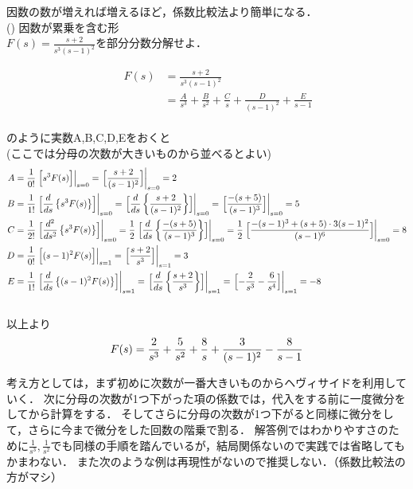\documentclass[a4paper,12pt]{report}
\begin{document}
  因数の数が増えれば増えるほど，係数比較法より簡単になる．\\

\quad({}) 因数が累乗を含む形 \\

\qquad \(F(s) =  \displaystyle\frac{s+2}{s^3(s-1)^2}\)を部分分数分解せよ．

\begin{align*}
  \qquad F(s) &= \frac{s+2}{s^3(s-1)^2} \\
      &= \frac{A}{s^3}+ \frac{B}{s^2}+ \frac{C}{s}
      + \frac{D}{(s-1)^2}+ \frac{E}{s-1}
\end{align*}\\
のように実数A,B,C,D,Eをおくと\\
(ここでは分母の次数が大きいものから並べるとよい)\\
\begin{align*}
  A &= \frac{1}{0!}\left.\Bigl[s^3F(s)\Bigr]\right|_{s=0} = \left.\Bigl[\frac{s+2}{(s-1)^2}\Bigr]\right|_{s=0} = 2\\
  B &= \frac{1}{1!}\left.\Bigl[\frac{d}{ds} \left\{s^3F(s)\right\}\Bigr]\right|_{s=0}
    = \left.\Bigl[\frac{d}{ds} \left\{\frac{s+2}{(s-1)^2}\right\}\Bigr]\right|_{s=0}
    = \left.\Bigl[\frac{-(s+5)}{(s-1)^3}\Bigr]\right|_{s=0} 
    = 5 \\
  C &=  \frac{1}{2!} \left.\Bigl[\frac{d^2}{ds^2} \left\{s^3F(s)\right\}\Bigr]\right|_{s=0} 
    = \frac{1}{2} \left.\Bigl[\frac{d}{ds} \left\{\frac{-(s+5)}{(s-1)^3}\right\}\Bigr]\right|_{s=0}  
    = \frac{1}{2} \left.\Bigl[\frac{-(s-1)^3+(s+5)\cdot3(s-1)^2}{(s-1)^6}\Bigr]\right|_{s=0} 
    = 8\\
  D &= \frac{1}{0!} \left.\Bigl[(s-1)^2F(s)\Bigr]\right|_{s=1}
    = \left.\Bigl[\frac{s+2}{s^3}\Bigr]\right|_{s=1}
    = 3\\
  E &= \frac{1}{1!} \left.\Bigl[\frac{d}{ds}\left\{(s-1)^2F(s)\right\}\Bigr]\right|_{s=1}
    = \left.\Bigl[\frac{d}{ds}\left\{\frac{s+2}{s^3}\right\}\Bigr]\right|_{s=1}
    = \left.\Bigl[-\frac{2}{s^3}-\frac{6}{s^4}\Bigr]\right|_{s=1} 
    = -8\\
\end{align*}\\
以上より
\[
  F(s) = \frac{2}{s^3} + \frac{5}{s^2}+ \frac{8}{s} + \frac{3}{(s-1)^2} - \frac{8}{s-1}\\
\]
\newpage

考え方としては，まず初めに次数が一番大きいものからヘヴィサイドを利用していく．
次に分母の次数が1つ下がった項の係数では，代入をする前に一度微分をしてから計算をする．
そしてさらに分母の次数が1つ下がると同様に微分をして，さらに今まで微分をした回数の階乗で割る．
解答例ではわかりやすさのために\(\frac{1}{s^3},\frac{1}{s^2}\)でも同様の手順を踏んでいるが，結局関係ないので実践では省略してもかまわない．
また次のような例は再現性がないので推奨しない．（係数比較法の方がマシ）\\
\end{document}
